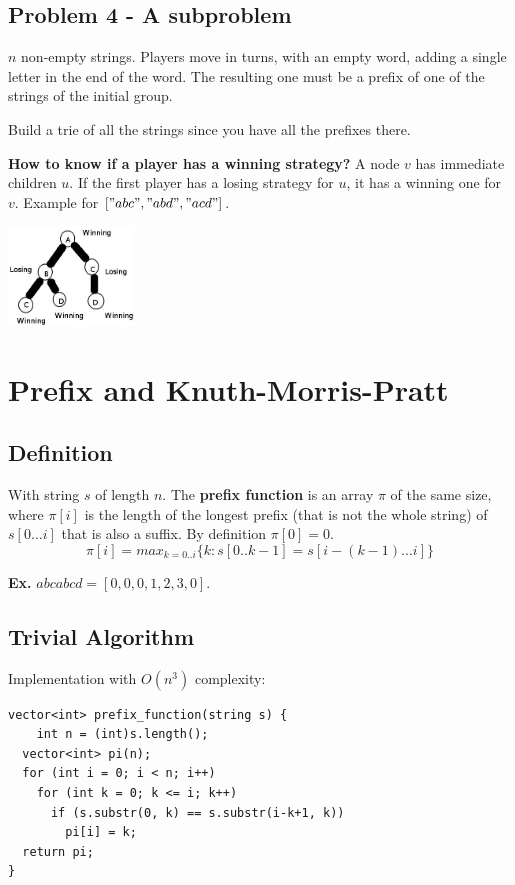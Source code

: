 \documentclass{IEEEtran}
\begin{document}
    \subsection{Problem 4 - A subproblem}
      $n$ non-empty strings. Players move in turns, with an empty word, adding a single letter in the end of the word. The resulting one must be a prefix of one of the strings of the initial group.\par 
      Build a trie of all the strings since you have all the prefixes there. \par 
      \textbf{How to know if a player has a winning strategy?} A node $v$ has immediate children $u$. If the first player has a losing strategy for $u$, it has a winning one for $v$. Example for $["abc","abd","acd"]$.
      \begin{center}
        \includegraphics[width=0.25\textwidth]{trieExampleSubProblem.png}
      \end{center}
  \section{Prefix and Knuth-Morris-Pratt}
    \subsection{Definition}
      With string $s$ of length $n$. The \textbf{prefix function} is an array $\pi$ of the same size, where $\pi[i]$ is the length of the longest prefix (that is not the whole string) of $s[0\ldots i]$ that is also a suffix. By definition $\pi[0]=0$.
      $$\pi[i]=max_{k=0..i}\{k:s[0..k-1]=s[i-(k-1)...i]\}$$
      \par \textbf{Ex.} $abcabcd = [0,0,0,1,2,3,0]$.
    \subsection{Trivial Algorithm}
      Implementation with $O(n^3)$ complexity:
      \begin{lstlisting}
vector<int> prefix_function(string s) {
    int n = (int)s.length();
  vector<int> pi(n);
  for (int i = 0; i < n; i++)
    for (int k = 0; k <= i; k++)
      if (s.substr(0, k) == s.substr(i-k+1, k))
        pi[i] = k;
  return pi;
}
      \end{lstlisting}
\end{document}
